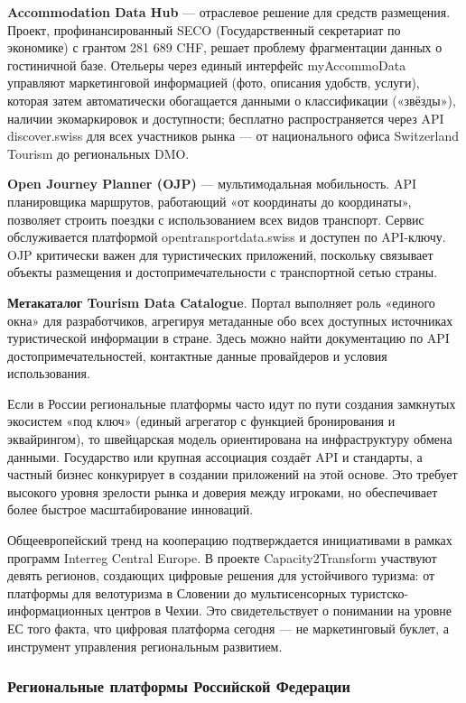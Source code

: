 \textbf{Accommodation Data Hub} --- отраслевое решение для средств размещения. Проект, профинансированный SECO (Государственный секретариат по экономике) с грантом 281 689 CHF, решает проблему фрагментации данных о гостиничной базе. Отельеры через единый интерфейс myAccommoData управляют маркетинговой информацией (фото, описания удобств, услуги), которая затем автоматически обогащается данными о классификации («звёзды»), наличии экомаркировок и доступности; бесплатно распространяется через API discover.swiss для всех участников рынка — от национального офиса Switzerland Tourism до региональных DMO.

\textbf{Open Journey Planner (OJP)} --- мультимодальная мобильность.
API планировщика маршрутов, работающий «от координаты до координаты», позволяет строить поездки с использованием всех видов транспорт. Сервис обслуживается платформой opentransportdata.swiss и доступен по API-ключу. OJP критически важен для туристических приложений, поскольку связывает объекты размещения и достопримечательности с транспортной сетью страны.

\textbf{Метакаталог Tourism Data Catalogue}. Портал выполняет роль «единого окна» для разработчиков, агрегируя метаданные обо всех доступных источниках туристической информации в стране. Здесь можно найти документацию по API достопримечательностей, контактные данные провайдеров и условия использования.

Если в России региональные платформы часто идут по пути создания замкнутых экосистем «под ключ» (единый агрегатор с функцией бронирования и эквайрингом), то швейцарская модель ориентирована на инфраструктуру обмена данными. Государство или крупная ассоциация создаёт API и стандарты, а частный бизнес конкурирует в создании приложений на этой основе. Это требует высокого уровня зрелости рынка и доверия между игроками, но обеспечивает более быстрое масштабирование инноваций.

Общеевропейский тренд на кооперацию подтверждается инициативами в рамках программ Interreg Central Europe. В проекте Capacity2Transform участвуют девять регионов, создающих цифровые решения для устойчивого туризма: от платформы для велотуризма в Словении до мультисенсорных туристско-информационных центров в Чехии. Это свидетельствует о понимании на уровне ЕС того факта, что цифровая платформа сегодня — не маркетинговый буклет, а инструмент управления региональным развитием.
\subsubsection{Региональные платформы Российской Федерации}

